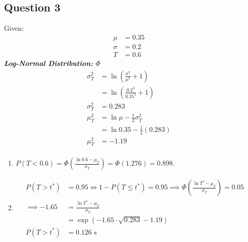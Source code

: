 \documentclass[13pt]{article}
\begin{document}
\subsection*{Question 3}
Given:
\begin{align*}
  \mu &= 0.35 \\
  \sigma &= 0.2 \\
  T &= 0.6
\end{align*}
\textit{\textbf{Log-Normal Distribution: $\Phi$}}
\begin{align*}
  \sigma_T^2 &= \ln \left( \frac{\sigma^2}{\mu^2} + 1 \right) \\
             &= \ln \left( \frac{0.2^2}{0.35^2} + 1 \right) \\
  \sigma_T^2 &= 0.283 \\
  \mu_T^2 &= \ln \mu - \frac{1}{2} \sigma_T^2 \\
             &= \ln 0.35 - \frac{1}{2} \left( 0.283 \right) \\
  \mu_T^2 &= -1.19 \\
\end{align*}
\begin{enumerate}[label=(\alph*)]
\item $P(T < 0.6) = \Phi \left( \frac{\ln 0.6 - \mu_T}{\sigma_T} \right) = \Phi(1.276) = 0.898$.
\item
  \begin{align*}
    P(T > t^*) &= 0.95 \iff 1 - P(T \leq t^*) = 0.95
                 \implies \Phi \left( \frac{\ln T^* - \mu_T}{\sigma_T} \right) = 0.05 \\
    \implies -1.65 &= \frac{\ln T^* - \mu_T}{\sigma_T} \\
                      &= \exp(-1.65 \cdot \sqrt{0.283} - 1.19) \\
    P(T > t^*) &= 0.126 \text{ s}
  \end{align*}
\end{enumerate}
\end{document}
